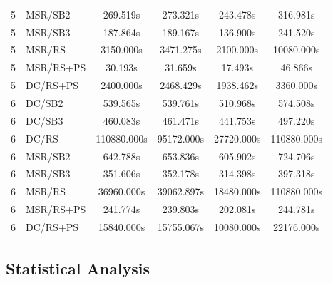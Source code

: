 \documentclass[10pt,a4paper]{article}
\begin{document}
\begin{longtable}{c l c c c c}
5 & MSR/SB2 & 269.519s & 273.321s & 243.478s & 316.981s \\
5 & MSR/SB3 & 187.864s & 189.167s & 136.900s & 241.520s \\
5 & MSR/RS & 3150.000s & 3471.275s & 2100.000s & 10080.000s \\
5 & MSR/RS+PS & 30.193s & 31.659s & 17.493s & 46.866s \\
5 & DC/RS+PS & 2400.000s & 2468.429s & 1938.462s & 3360.000s \\
\midrule
6 & DC/SB2 & 539.565s & 539.761s & 510.968s & 574.508s \\
6 & DC/SB3 & 460.083s & 461.471s & 441.753s & 497.220s \\
6 & DC/RS & 110880.000s & 95172.000s & 27720.000s & 110880.000s \\
6 & MSR/SB2 & 642.788s & 653.836s & 605.902s & 724.706s \\
6 & MSR/SB3 & 351.606s & 352.178s & 314.398s & 397.318s \\
6 & MSR/RS & 36960.000s & 39062.897s & 18480.000s & 110880.000s \\
6 & MSR/RS+PS & 241.774s & 239.803s & 202.081s & 244.781s \\
6 & DC/RS+PS & 15840.000s & 15755.067s & 10080.000s & 22176.000s \\
\end{longtable}

\subsection{Statistical Analysis}
\end{document}
